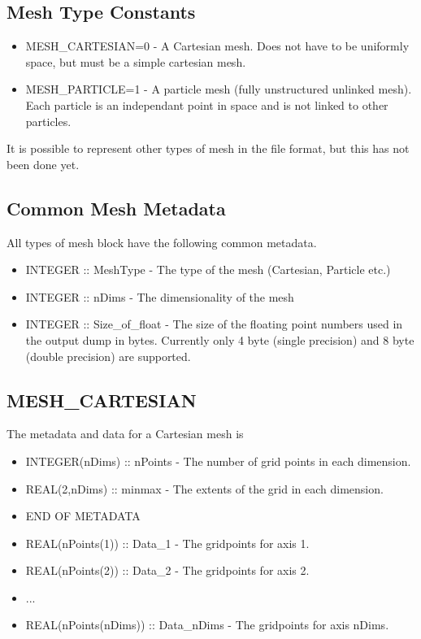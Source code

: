 \documentclass[8pt]{article}
\begin{document}
\subsection{Mesh Type Constants}
\begin{itemize}
\item MESH\_CARTESIAN=0 - A Cartesian mesh. Does not have to be uniformly space, but must be a simple cartesian mesh.
\item MESH\_PARTICLE=1 - A particle mesh (fully unstructured unlinked mesh). Each particle is an independant point in space and is not linked to other particles.
\end{itemize}
It is possible to represent other types of mesh in the file format, but this has not been done yet.
\subsection{Common Mesh Metadata}
All types of mesh block have the following common metadata.
\begin{itemize}
  \item INTEGER :: MeshType - The type of the mesh (Cartesian, Particle etc.)
  \item INTEGER :: nDims - The dimensionality of the mesh
  \item INTEGER :: Size\_of\_float - The size of the floating point numbers used in the output dump in bytes. Currently only 4 byte (single precision) and 8 byte (double precision) are supported.
\end{itemize}
\subsection{MESH\_CARTESIAN}
The metadata and data for a Cartesian mesh is
\begin{itemize}
\item INTEGER(nDims) :: nPoints - The number of grid points in each dimension.
\item REAL(2,nDims)  :: minmax - The extents of the grid in each dimension.
\item END OF METADATA
\item REAL(nPoints(1)) :: Data\_1 - The gridpoints for axis 1.
\item REAL(nPoints(2)) :: Data\_2 - The gridpoints for axis 2.
\item ...
\item REAL(nPoints(nDims)) :: Data\_nDims - The gridpoints for axis nDims.
\end{itemize}
\end{document}
